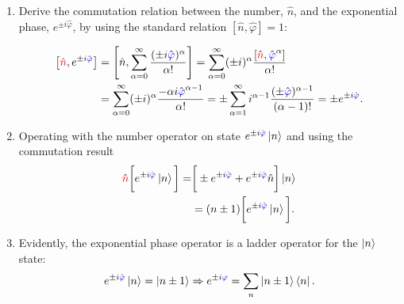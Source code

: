 \documentclass[%
superscriptaddress,
preprint,
preprintnumbers,
bibnotes,
amsmath,
amssymb,
aps,
showkeys,
prb,
]{revtex4-2}
\newcommand{\red}[1]{{\color{red}{#1}}}
\newcommand{\blue}[1]{\textcolor{blue}{#1}}
\newcommand{\iket}[1]{\ensuremath{\Ket{#1}}}
\newcommand{\iketbra}[2]{\ket{#1}\bra{#2}}
\newcommand{\icommutation}[2]{\ensuremath{\left[#1,                                #2\right]}}
\begin{document}
\begin{enumerate}
\item Derive  the commutation relation  between the number, $  \hat{n} $, and  the exponential
  phase,     $    e^{\pm     i\hat{\varphi}}     $,    by     using     the    standard     relation
  $ \left[\hat{n},\hat{\varphi}\right] = 1 $:
 
  {\scriptsize\begin{equation}\label{eq:ab1}
      \begin{aligned}
        \icommutation{\hat{\red{n}}}{e^{\pm i \hat{\blue{\varphi}}}} & =  \icommutation{\hat{n}}{\sum_{\alpha = 0}^{\infty} \frac{(\pm i\hat{\blue{\varphi}})^\alpha}{\alpha!}} = \sum_{\alpha = 0}^{\infty} (\pm i)^\alpha\frac{\icommutation{\hat{\red{n}}}{\hat{\blue{\varphi}}^\alpha}}{\alpha!}\\
        &  = \sum_{\alpha  = 0}^{\infty}  (\pm i)^\alpha\frac{-\alpha  i\hat{\blue{\varphi}}^{\alpha -  1}}{\alpha!}  =  \pm \sum_{\alpha  =
          1}^{\infty}i^{\alpha  -  1}\frac{(\pm\hat{\blue{\varphi}})^{\alpha  -  1}}{(\alpha   -  1)!}   =  \pm  e^{\pm
          i\hat{\blue{\varphi}}}.
      \end{aligned}
    \end{equation}}

\item Operating with the number operator on state $ e^{\pm i\hat{\blue{\varphi}}}\ket{n} $ and using
  the commutation result \begin{equation}\label{eq:ab2}
    \begin{aligned}
      \hat{\red{n}}\bigg[e^{\pm   i\hat{\blue{\varphi}}}\ket{n}\bigg]    =   &    \bigg[\pm   e^{\pm
        i\hat{\blue{\varphi}}}   +  e^{\pm   i\hat{\blue{\varphi}}}\hat{n}\bigg]\ket{n}  \\   &  =   (n\pm
      1)\bigg[e^{\pm i\hat{\blue{\varphi}}}\ket{n}\bigg].
    \end{aligned}
  \end{equation}

\item Evidently, the exponential phase operator is a ladder operator for the \iket{n} state:
  \begin{equation}
    \label{eq:ab5}
    e^{\pm i\hat{\blue{\varphi}}}\ket{n} = \ket{n \pm 1} \Rightarrow e^{\pm i\blue{\varphi}} = \sum_{{n}} \iketbra{n\pm1}{n}.
  \end{equation}
 

\end{enumerate}
\end{document}
